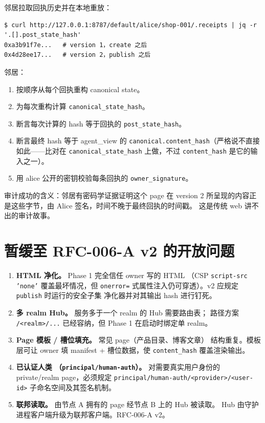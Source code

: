 \documentclass[11pt,a4paper]{article}
\theoremstyle{definition}
\begin{document}
邻居拉取回执历史并在本地重放：

\begin{lstlisting}
$ curl http://127.0.0.1:8787/default/alice/shop-001/.receipts | jq -r '.[].post_state_hash'
0xa3b91f7e...   # version 1，create 之后
0x4d28ee17...   # version 2，publish 之后
\end{lstlisting}

\noindent 邻居：
\begin{enumerate}[leftmargin=2em,itemsep=0.15em]
    \item 按顺序从每个回执重构 canonical state。
    \item 为每次重构计算 \texttt{canonical\_state\_hash}。
    \item 断言每次计算的 hash 等于回执的 \texttt{post\_state\_hash}。
    \item 断言最终 hash 等于 agent\_view 的
    \texttt{canonical.content\_hash}（严格说不直接如此——比对在
    \texttt{canonical\_state\_hash} 上做，不过 \texttt{content\_hash}
    是它的输入之一）。
    \item 用 alice 公开的密钥校验每条回执的 \texttt{owner\_signature}。
\end{enumerate}

\noindent 审计成功的含义：邻居有密码学证据证明这个 page 在 version 2
所呈现的内容正是这些字节，由 Alice 签名，时间不晚于最终回执的时间戳。
这是传统 web 讲不出的审计故事。

\section{暂缓至 RFC-006-A v2 的开放问题}
\label{sec:open}

\begin{enumerate}[leftmargin=2.2em,itemsep=0.2em]
    \item \textbf{HTML 净化。} Phase 1 完全信任 owner 写的 HTML
    （CSP \texttt{script-src 'none'} 覆盖最坏情况，但 \texttt{onerror=}
    式属性注入仍可穿透）。v2 应规定 \texttt{publish} 时运行的安全子集
    净化器并对其输出 hash 进行钉死。
    \item \textbf{多 realm Hub。} 服务多于一个 realm 的 Hub 需要路由表；
    路径方案 \texttt{/<realm>/...} 已经容纳，但 Phase 1 在启动时绑定单
    realm。
    \item \textbf{Page 模板 / 槽位填充。} 常见 page（产品目录、博客文章）
    结构重复。模板层可让 owner 填 manifest + 槽位数据，使
    \texttt{content\_hash} 覆盖渲染输出。
    \item \textbf{已认证人类
    （\texttt{principal/human-auth}）。} 对需要真实用户身份的 private/realm
    page，必须规定 \texttt{principal/human-auth/<provider>/<user-id>}
    子命名空间及其签名机制。
    \item \textbf{联邦读取。} 由节点 A 拥有的 page 经节点 B 上的 Hub 被读取。
    Hub 由守护进程客户端升级为联邦客户端。RFC-006-A v2。
\end{enumerate}
\end{document}
